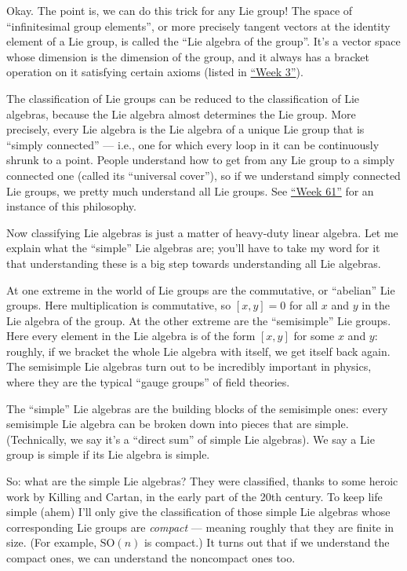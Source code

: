 \documentclass{article}
\begin{document}
Okay. The point is, we can do this trick for any Lie group! The space of
``infinitesimal group elements'', or more precisely tangent vectors at
the identity element of a Lie group, is called the ``Lie algebra of the
group''. It's a vector space whose dimension is the dimension of the
group, and it always has a bracket operation on it satisfying certain
axioms (listed in \protect\hyperlink{week3}{``Week 3''}).

The classification of Lie groups can be reduced to the classification of
Lie algebras, because the Lie algebra almost determines the Lie group.
More precisely, every Lie algebra is the Lie algebra of a unique Lie
group that is ``simply connected'' --- i.e., one for which every loop in
it can be continuously shrunk to a point. People understand how to get
from any Lie group to a simply connected one (called its ``universal
cover''), so if we understand simply connected Lie groups, we pretty
much understand all Lie groups. See \protect\hyperlink{week61}{``Week
61''} for an instance of this philosophy.

Now classifying Lie algebras is just a matter of heavy-duty linear
algebra. Let me explain what the ``simple'' Lie algebras are; you'll
have to take my word for it that understanding these is a big step
towards understanding all Lie algebras.

At one extreme in the world of Lie groups are the commutative, or
``abelian'' Lie groups. Here multiplication is commutative, so
\([x,y] = 0\) for all \(x\) and \(y\) in the Lie algebra of the group.
At the other extreme are the ``semisimple'' Lie groups. Here every
element in the Lie algebra is of the form \([x,y]\) for some \(x\) and
\(y\): roughly, if we bracket the whole Lie algebra with itself, we get
itself back again. The semisimple Lie algebras turn out to be incredibly
important in physics, where they are the typical ``gauge groups'' of
field theories.

The ``simple'' Lie algebras are the building blocks of the semisimple
ones: every semisimple Lie algebra can be broken down into pieces that
are simple. (Technically, we say it's a ``direct sum'' of simple Lie
algebras). We say a Lie group is simple if its Lie algebra is simple.

So: what are the simple Lie algebras? They were classified, thanks to
some heroic work by Killing and Cartan, in the early part of the 20th
century. To keep life simple (ahem) I'll only give the classification of
those simple Lie algebras whose corresponding Lie groups are
\emph{compact} --- meaning roughly that they are finite in size. (For
example, \(\mathrm{SO}(n)\) is compact.) It turns out that if we
understand the compact ones, we can understand the noncompact ones too.
\end{document}
